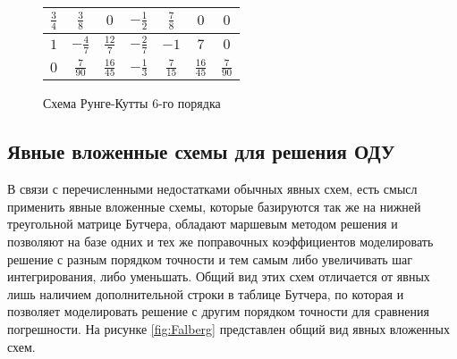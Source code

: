\begin{figure}
\begin{minipage}[t]{7.5cm}
\begin{table}
\begin{tabular}{|c|c|c|c|c|c|c|}
            $\frac{3}{4}$ & $\frac{3}{8}$ & $0$ & $-\frac{1}{2}$ & $\frac{7}{8}$ & $0$ & $0$\\
            \hline
            $1$ & $-\frac{4}{7}$ & $\frac{12}{7}$ & $-\frac{2}{7}$ & $-1$ & $7$ & $0$\\
            \hline
            $0$ & \cellcolor{lightgray} $\frac{7}{90}$ & \cellcolor{lightgray} $\frac{16}{45}$ & \cellcolor{lightgray} $-\frac{1}{3}$ & \cellcolor{lightgray} $\frac{7}{15}$ & \cellcolor{lightgray} $\frac{16}{45}$ & \cellcolor{lightgray} $\frac{7}{90}$\\
            \hline
            \end{tabular}
        \end{table}
    \end{minipage}
    \caption{Схема Рунге-Кутты 6-го порядка}
    \label{fig:RungeKutta6}
\end{figure}

\subsection{Явные вложенные схемы для решения ОДУ}

В связи с перечисленными недостатками обычных явных схем, есть смысл применить явные вложенные схемы, которые базируются так же на
нижней треугольной матрице Бутчера, обладают маршевым
методом решения и позволяют на базе одних и тех же поправочных коэффициентов моделировать решение с разным порядком точности и тем
самым либо увеличивать шаг интегрирования, либо уменьшать. Общий вид этих схем отличается от явных лишь наличием дополнительной строки
в таблице Бутчера, по которая и позволяет моделировать решение с другим порядком точности для сравнения погрешности. На рисунке
\ref{fig:Falberg} представлен общий вид явных вложенных схем.


